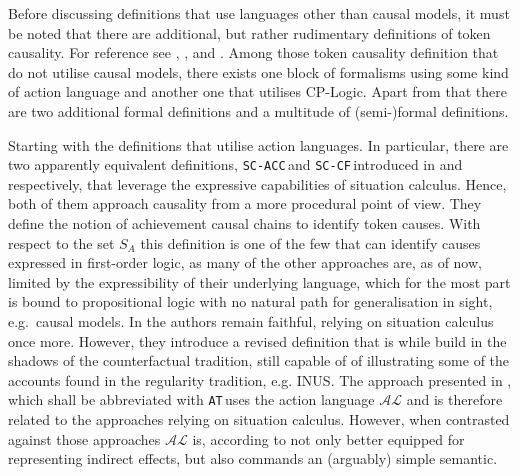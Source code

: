 \documentclass[11pt,a4paper]{book}
\theoremstyle{definition}
\theoremstyle{definition}
\theoremstyle{definition}
\theoremstyle{remark}
\newcommand{\prset}{S_{A}}
\newcommand{\scacc}{\texttt{SC-ACC}\,}
\newcommand{\at}{\texttt{AT}\,}
\newcommand{\sccf}{\texttt{SC-CF}\,}
\begin{document}
Before discussing definitions that use languages other than causal models, it must be noted that there are additional, but rather rudimentary definitions of token causality. For reference see \parencite{halpern2011actual}, \parencite{halpern2015graded}, \parencite{schaffer2016grounding} and \parencite{weslake2015partial}. 
Among those token causality definition that do not utilise causal models, there exists one block of formalisms using some kind of action language and another one that utilises CP-Logic. Apart from that there are two additional formal definitions and a multitude of (semi-)formal definitions.

Starting with the definitions that utilise action languages. In particular, there are two apparently equivalent definitions, \scacc and \sccf introduced in \parencite{batusov2018situation} and \parencite{khannecessary}  respectively, that leverage the expressive capabilities of situation calculus. Hence, both of them approach causality from a more procedural point of view.
They define the notion of achievement causal chains to identify token causes.  With respect to the set $\prset$ this definition is one of the few that can identify causes expressed in first-order logic, as many of the other approaches are, as of now, limited by the expressibility of their underlying language, which for the most part is bound to propositional logic with no natural path for generalisation in sight, e.g.\ causal models. In \parencite{khannecessary} the authors remain faithful, relying on situation calculus once more. However, they introduce a revised definition that is while build in the shadows of the counterfactual tradition, still capable of of illustrating some of the accounts found in the regularity tradition, e.g. INUS.
The approach presented in \parencite{leblanc2019explaining}, which shall be abbreviated with \at uses the action language $\mathcal{AL}$ and is therefore related to the approaches relying on situation calculus. However, when contrasted against those approaches $\mathcal{AL}$ is, according to \parencite{leblanc2019explaining} not only better equipped for representing indirect effects, but also commands an (arguably) simple semantic.
\end{document}
